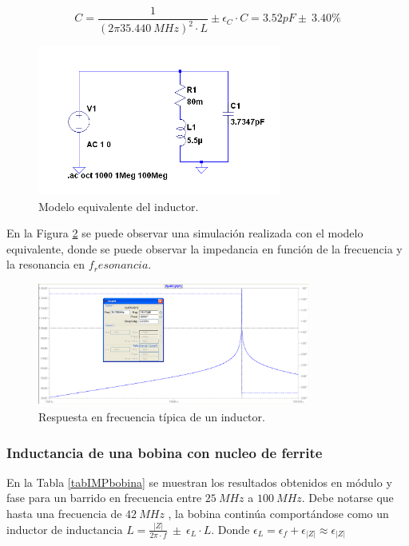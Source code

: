 \documentclass[a4paper,10pt]{article}
\begin{document}
		$$C=\frac{1}{(2\pi 35.440~MHz)^2 \cdot L}\pm \epsilon_C \cdot C=3.52pF \pm~3.40\%$$
		\begin{figure}[!htb]
			\centering
			\includegraphics[width=8cm]
			{Imagenes/induceqquiv.png}
			\caption{Modelo equivalente del inductor.}
			\label{inductorequiv} 
		\end{figure}
		
		\indent En la Figura \ref{respfreq} se puede observar una simulaci\'on 
		realizada con el modelo equivalente, donde se puede observar la 
		impedancia en funci\'on de la frecuencia y la resonancia en 
		$f_resonancia$.
		
		\begin{figure}[!htb]
			\centering
			\includegraphics[width=9cm]
			{Imagenes/respfreq.png}
			\caption{Respuesta en frecuencia t\'ipica de un inductor.}
			\label{respfreq} 
		\end{figure}
		
		\subsubsection{Inductancia de una bobina con nucleo de ferrite}
		
		\indent En la Tabla \ref{tabIMPbobina} se muestran los resultados 
		obtenidos en m\'odulo y fase para un barrido en frecuencia entre 
		$25~MHz$ a $100~MHz$. Debe notarse que hasta una frecuencia de  $42~MHz$
		, la bobina contin\'ua comport\'andose como un inductor de inductancia 
		$L=\frac{\left|Z\right|}{2\pi\cdot f}~\pm~\epsilon_L\cdot L$. Donde 
		$\epsilon_L=\epsilon_f+\epsilon_{\left|Z\right|}\approx
		\epsilon_{\left|Z\right|}$
		
\end{document}
